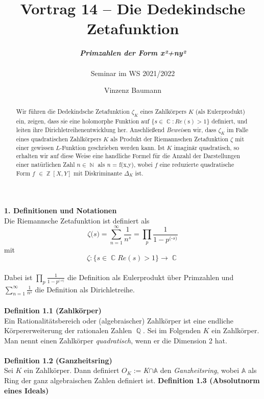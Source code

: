 \documentclass[10pt,a4paper]{article}
\title{\textbf{Vortrag 14} \textbf{-- Die Dedekindsche Zetafunktion}}
\author{ \textit{\textbf{Primzahlen der Form x²+ny²}} \\ \\Seminar im WS 2021/2022}
\date{Vinzenz Baumann}
\DeclareMathOperator{\C}{\mathbb{C}}
\DeclareMathOperator{\Q}{\mathbb{Q}}
\DeclareMathOperator{\Z}{\mathbb{Z}}
\DeclareMathOperator{\N}{\mathbb{N}}
\begin{document}
\maketitle

\begin{abstract}

Wir führen die Dedekindsche Zetafunktion $\zeta_{\textit{K}}$ eines Zahlkörpers $\textit{K}$ (als Eulerprodukt) ein, zeigen, dass sie eine holomorphe Funktion auf  $\{\textit{s}  \in  \C: Re(\text{s})  >  1  \} $ definiert, und leiten ihre Dirichletreihenentwicklung her. Anschließend \textit{Beweis}en wir, dass $\zeta_{\textit{K}}$ im Falle eines quadratischen Zahlkörpers  $\textit{K}$ als Produkt der Riemannschen Zetafunktion $\zeta$ mit einer gewissen $\textit{L}$-Funktion geschrieben werden kann.
Ist $\textit{K}$ imaginär quadratisch, so erhalten wir auf diese Weise eine handliche Formel für die Anzahl der Darstellungen einer natürlichen Zahl $\textit{n} \in \N$ als \textit{n} = f(x,y), wobei $f$ eine reduzierte quadratische Form $f$ $\in \Z[X,Y]$ mit Diskriminante $\Delta_\textit{K}$ ist.



\end{abstract}
\textbf{1. Definitionen und Notationen}
\\

Die Riemannsche Zetafunktion ist definiert als  $$\zeta \textit{(s)}= \sum_{n = 1}^\infty  \frac{1}{n^s} =  \prod_{\textit{p}} \frac{1}{1-\textit{p}^\textit{(-s)}} $$ mit  $$ \zeta : \{\textit{s} \in \C Re(\textit{s}) > 1\}\rightarrow \C$$ \\
Dabei ist $\prod_{\textit{p}} \frac{1}{1-\textit{p}^\textit{(-s)}}$ die Definition als Eulerprodukt über Primzahlen und $\sum_{n = 1}^\infty  \frac{1}{n^s} $ die Definition als Dirichletreihe.
\\
\\
\textbf{Definition 1.1 (Zahlkörper)}
\\

Ein Rationalitätsbereich oder (algebraischer) Zahlkörper ist eine endliche Körpererweiterung der rationalen Zahlen $\Q$.
Sei im Folgenden $\textit{K}$ ein Zahlkörper. Man nennt einen Zahlkörper \textit{quadratisch}, wenn er die Dimension 2 hat. 
\\
\\
\textbf{Definition 1.2 (Ganzheitsring)}
\\

Sei $\textit{K}$ ein Zahlkörper. Dann definiert $O_{K} := $\textit{K}$ \cap \mathbb{A}$ den \textit{Ganzheitsring}, wobei $\mathbb{A}$ als Ring der ganz algebraischen Zahlen definiert ist.
\newpage
\textbf{Definition 1.3 (Absolutnorm eines Ideals)}
\\
\end{document}
